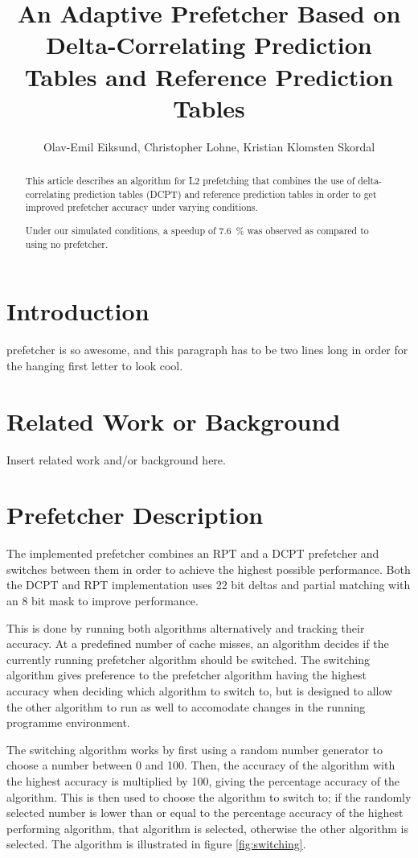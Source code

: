 \documentclass[journal,a4paper]{IEEEtran}
\begin{document}
\title{An Adaptive Prefetcher Based on Delta-Correlating Prediction Tables and Reference Prediction Tables}
\author{Olav-Emil Eiksund, Christopher Lohne, Kristian Klomsten Skordal}
\maketitle

\begin{abstract}
This article describes an algorithm for L2 prefetching that combines the use of
delta-correlating prediction tables (DCPT) and reference prediction tables in
order to get improved prefetcher accuracy under varying conditions.

Under our simulated conditions, a speedup of 7.6~\% was observed as compared to
using no prefetcher.
\end{abstract}

\section{Introduction}
 prefetcher is so awesome, and this paragraph has to be two
lines long in order for the hanging first letter to look cool.

\section{Related Work or Background}
Insert related work and/or background here.

\section{Prefetcher Description}
The implemented prefetcher combines an RPT and a DCPT prefetcher and
switches between them in order to achieve the highest possible performance.
Both the DCPT and RPT implementation uses 22 bit deltas and partial matching
with an 8 bit mask to improve performance.

This is done by running both algorithms alternatively and tracking their
accuracy. At a predefined number of cache misses, an algorithm decides if the
currently running prefetcher algorithm should be switched. The switching
algorithm gives preference to the prefetcher algorithm having the highest
accuracy when deciding which algorithm to switch to, but is designed to allow
the other algorithm to run as well to accomodate changes in the running
programme environment.

The switching algorithm works by first using a random number generator to
choose a number between 0 and 100. Then, the accuracy of the algorithm with the
highest accuracy is multiplied by 100, giving the percentage accuracy of the
algorithm. This is then used to choose the algorithm to switch to; if the randomly
selected number is lower than or equal to the percentage accuracy of the highest
performing algorithm, that algorithm is selected, otherwise the other algorithm
is selected. The algorithm is illustrated in figure \ref{fig:switching}.
\end{document}
